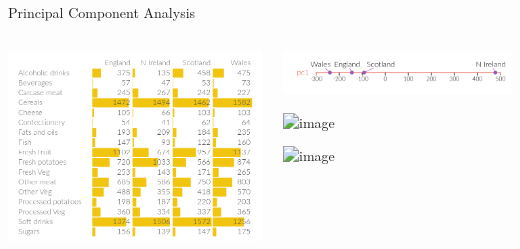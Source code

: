 \documentclass[compress]{beamer}
\begin{document}
{\begin{frame}{Principal Component Analysis}
{    \begin{columns}
        \begin{column}{0.5\linewidth}
    \begin{center}
        \includegraphics[width=\linewidth]{pca-food-example}
    \end{center}

        \end{column}
        \begin{column}{0.5\linewidth}
            \begin{center}
                \includegraphics[width=\linewidth]{pca-food-example-1-eigenvector}

                \includegraphics<4->[width=\linewidth]{pca-food-example-2-eigenvector}

                \includegraphics<5->[width=\linewidth]{pca-food-example-load-plot}
            \end{center}
        \end{column}
    \end{columns}

    }

\end{frame}
}

\end{document}
